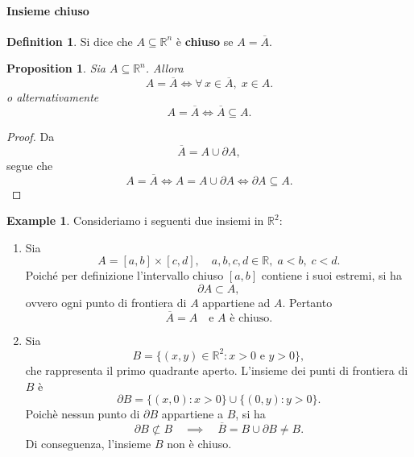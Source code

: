 \documentclass{article}
\theoremstyle{plain}
\newtheorem{prop}[thm]{Proposition}
\theoremstyle{definition}
\newtheorem{defn}{Definition}[section]
\newtheorem{exmp}{Example}[section]
\theoremstyle{remark}
\begin{document}
\vspace{10pt}

\paragraph{Insieme chiuso}
\begin{bxthm}
\begin{defn}
    Si dice che $A\subseteq\mathbb{R}^n$ è \textbf{chiuso} se $A=\overline{A}$.
\end{defn}
\end{bxthm}

\vspace{10pt}

\begin{bxthm}
\begin{prop}
    Sia $A\subseteq\mathbb{R}^n$.
    Allora 
    \[A=\overline{A}\iff\forall\,x\in\overline{A},\;x\in A.\]
    o alternativamente
    \[A=\overline{A}\iff\overline{A}\subseteq A.\]
\end{prop}
\end{bxthm}
\begin{proof}
    Da
    \[\overline{A}=A\cup\partial A,\]
    segue che 
    \[A=\overline{A}\iff A=A\cup \partial A \iff\partial A\subseteq A.\]
\end{proof}

\vspace{10pt}

\begin{exmp}
Consideriamo i seguenti due insiemi in $\mathbb{R}^2$:
\begin{enumerate}
    \item Sia 
    \[
    A = [a,b] \times [c,d], \quad a,b,c,d\in\mathbb{R},\; a<b,\; c<d.
    \]
    Poiché per definizione l'intervallo chiuso $[a,b]$ contiene i suoi estremi, si ha
    \[
    \partial A \subset A,
    \]
    ovvero ogni punto di frontiera di $A$ appartiene ad $A$. Pertanto
    \[
    \overline{A} = A \quad \text{e } A \text{ è chiuso.}
    \]

    \item Sia
    \[
    B = \{(x,y)\in\mathbb{R}^2 : x>0 \text{ e } y>0\},
    \]
    che rappresenta il primo quadrante aperto. L'insieme dei punti di frontiera di $B$ è
    \[
    \partial B = \{(x,0) : x>0\}\cup\{(0,y) : y>0\}.
    \]
    Poichè nessun punto di $\partial B$ appartiene a $B$, si ha
    \[
    \partial B \not\subset B \quad \implies \quad \overline{B} = B\cup \partial B \neq B.
    \]
    Di conseguenza, l'insieme $B$ non è chiuso.
\end{enumerate}
\end{exmp}
\end{document}
